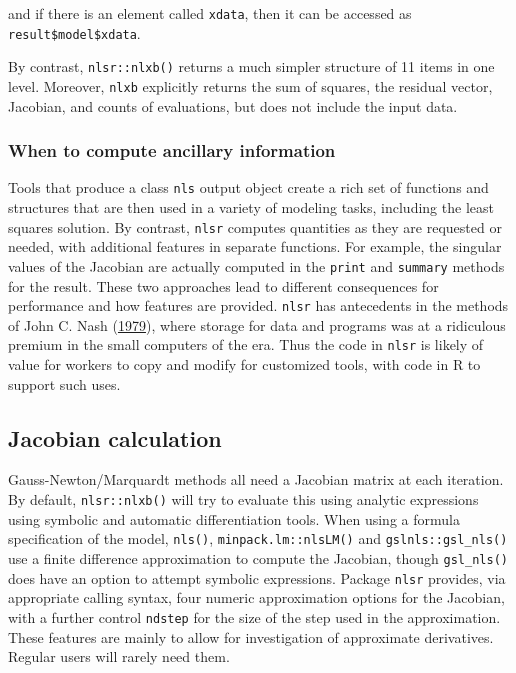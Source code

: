 and if there is an element called \texttt{xdata}, then it can be accessed as
\texttt{result\$model\$xdata}.

By contrast, \texttt{nlsr::nlxb()} returns a much simpler structure of 11 items
in one level. Moreover, \texttt{nlxb} explicitly returns the sum of squares, the
residual vector, Jacobian, and counts of evaluations, but does not include
the input data.

\hypertarget{when-to-compute-ancillary-information}{%
\subsubsection{When to compute ancillary information}\label{when-to-compute-ancillary-information}}

Tools that produce a class \texttt{nls} output object create a rich set of functions
and structures that are then used in a variety of modeling tasks, including the
least squares solution. By contrast,
\texttt{nlsr} computes quantities as they are requested or needed, with additional
features in separate functions. For example, the singular values of the Jacobian
are actually computed in the \texttt{print} and \texttt{summary} methods for the result.
These two approaches
lead to different consequences for performance and how features are
provided. \texttt{nlsr} has antecedents in the methods of John C. Nash (\protect\hyperlink{ref-cnm79}{1979}), where storage for
data and programs was at a ridiculous premium in the small computers of the era.
Thus the code in \texttt{nlsr} is likely of value for workers to copy and modify
for customized tools, with code in R to support such uses.

\hypertarget{jacobian-calculation}{%
\subsection{Jacobian calculation}\label{jacobian-calculation}}

Gauss-Newton/Marquardt methods all need a Jacobian matrix at each iteration.
By default, \texttt{nlsr::nlxb()} will try to evaluate this using analytic
expressions using symbolic and automatic differentiation tools.
When using a formula specification of the model, \texttt{nls()}, \texttt{minpack.lm::nlsLM()}
and \texttt{gslnls::gsl\_nls()} use a finite difference approximation to compute the
Jacobian, though \texttt{gsl\_nls()} does have an option to attempt symbolic expressions.
Package \texttt{nlsr} provides, via appropriate calling syntax, four numeric approximation
options for the Jacobian, with a further control \texttt{ndstep} for the size of the
step used in the approximation. These features are mainly to allow for investigation
of approximate derivatives. Regular users will rarely need them.

